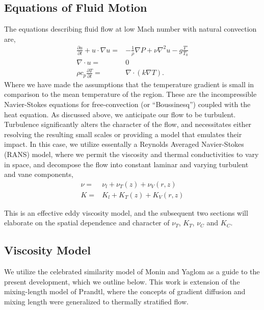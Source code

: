 \subsection{Equations of Fluid Motion}
%
%

The equations describing fluid flow at
low Mach number with natural convection are, 
\begin{eqnarray*}
 \frac{\partial u}{\partial t} + u \cdot \nabla u =&
  -\frac{1}{\rho}\nabla P + \nu \nabla^2 u - g \frac{T'}{T_0}\\
 \nabla \cdot u =& 0 \\
 \rho c_p \frac{\partial T}{\partial t} =& \nabla \cdot ( k \nabla T).
\end{eqnarray*} 
Where we have made the assumptions that the temperature gradient is small in
comparison to the mean temperature of the region. These are the
incompressible Navier-Stokes equations for free-convection (or
``Boussinesq'') coupled with the heat equation. 
%
%
%
As discussed above, we anticipate our flow to be
turbulent. Turbulence significantly alters the character of the flow,
and necessitates either resolving the resulting small scales or
providing a model that emulates their impact. In this case, we utilize 
essentally a Reynolds Averaged Navier-Stokes (RANS) model, where we
permit the viscosity and thermal conductivities to vary in space, and
decompose the flow into constant laminar and varying turbulent and vane
components,  
\begin{eqnarray*}
 \nu =& \nu_{l} + \nu_{T}(z) + \nu_{V}(r,z) \\
 K =& K_{l} + K_{T}(z) + K_{V}(r,z)
\end{eqnarray*}

This is an effective eddy viscosity model, and the subsequent two
sections will elaborate on the spatial dependence and character of
$\nu_T$, $K_T$, $\nu_C$ and $K_C$. 

\subsection{Viscosity Model}

We utilize the celebrated similarity model of Monin and
Yaglom\cite{monin2007statistical,monin1954basic} as a guide to the
present development, which we outline below. This work is extension of
the mixing-length model of Prandtl, where the concepts of gradient
diffusion and mixing length were generalized to thermally stratified
flow.   

